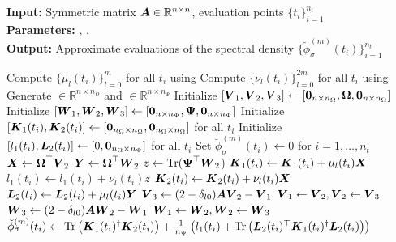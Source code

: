 \hspace*{\algorithmicindent} \textbf{Input:} Symmetric matrix $\boldsymbol{A} \in \mathbb{R}^{n \times n}$, evaluation points $\{t_i\}_{i=1}^{n_t}$ \\
\hspace*{\algorithmicindent} \textbf{Parameters:} , ,  \\
\hspace*{\algorithmicindent} \textbf{Output:} Approximate evaluations of the spectral density $\{\breve{\phi}_{\sigma}^{(m)}(t_i)\}_{i=1}^{n_t}$
\begin{algorithmic}[1]
    \State Compute $\{\mu_l(t_i)\}_{l=0}^{m}$ for all $t_i$ using 
    \State Compute $\{\nu_l(t_i)\}_{l=0}^{2m}$ for all $t_i$ using 
    \State Generate  $\in \mathbb{R}^{n \times n_{\Omega}}$ and  $\in \mathbb{R}^{n \times n_{\Psi}}$
    \State Initialize $[\boldsymbol{V}_1, \boldsymbol{V}_2, \boldsymbol{V}_3] \gets [\boldsymbol{0}_{n \times n_{\Omega}}, \boldsymbol{\boldsymbol{\Omega}}, \boldsymbol{0}_{n \times n_{\Omega}}]$
    \State Initialize $[\boldsymbol{W}_1, \boldsymbol{W}_2, \boldsymbol{W}_3] \gets [\boldsymbol{0}_{n \times n_{\Psi}}, \boldsymbol{\Psi}, \boldsymbol{0}_{n \times n_{\Psi}}]$
    \State Initialize $[\boldsymbol{K}_1(t_i), \boldsymbol{K}_2(t_i)] \gets [\boldsymbol{0}_{n_{\Omega} \times n_{\Omega}}, \boldsymbol{0}_{n_{\Omega} \times n_{\Omega}}]$ for all $t_i$
    \State Initialize $[l_1(t_i), \boldsymbol{L}_2(t_i)] \gets [0, \boldsymbol{0}_{n_{\Omega} \times n_{\Psi}}]$ for all $t_i$
    \State Set $\breve{\phi}_{\sigma}^{(m)}(t_i) \gets 0$ for $i=1,\dots,n_t$
      \State $\boldsymbol{X} \gets \boldsymbol{\boldsymbol{\Omega}}^{\top} \boldsymbol{V}_2$
      \State $\boldsymbol{Y} \gets \boldsymbol{\boldsymbol{\Omega}}^{\top} \boldsymbol{W}_2$
      \State $z \gets \operatorname{Tr}(\boldsymbol{\Psi}^{\top} \boldsymbol{W}_2$)
            \State $\boldsymbol{K}_1(t_i) \gets \boldsymbol{K}_1(t_i) + \mu_l(t_i) \boldsymbol{X}$
            \State $l_1(t_i) \gets l_1(t_i) + \nu_l(t_i) z$
        \EndIf
        \State $\boldsymbol{K}_2(t_i) \gets \boldsymbol{K}_2(t_i) + \nu_l(t_i) \boldsymbol{X}$
        \State $\boldsymbol{L}_2(t_i) \gets \boldsymbol{L}_2(t_i) + \mu_l(t_i) \boldsymbol{Y}$
      \EndFor
      \State $\boldsymbol{V}_3 \gets (2 - \delta_{l0}) \boldsymbol{A} \boldsymbol{V}_2 - \boldsymbol{V}_1$ 
      \State $\boldsymbol{V}_1 \gets \boldsymbol{V}_2, \boldsymbol{V}_2 \gets \boldsymbol{V}_3$
      \State $\boldsymbol{W}_3 \gets (2 - \delta_{l0}) \boldsymbol{A} \boldsymbol{W}_2 - \boldsymbol{W}_1$ 
      \State $\boldsymbol{W}_1 \gets \boldsymbol{W}_2, \boldsymbol{W}_2 \gets \boldsymbol{W}_3$
    \EndFor
      \State $\breve{\phi}_{\sigma}^{(m)}(t_i) \gets \operatorname{Tr}\left( \boldsymbol{K}_1(t_i)^{\dagger}\boldsymbol{K}_2(t_i) \right) + \frac{1}{n_{\Psi}} \left( l_1(t_i) + \operatorname{Tr}\left( \boldsymbol{L}_2(t_i)^{\top} \boldsymbol{K}_1(t_i)^{\dagger} \boldsymbol{L}_2(t_i) \right)  \right) $ \label{lin:4-nystromchebyshev-nystrom-pp}
    \EndFor
\end{algorithmic}
